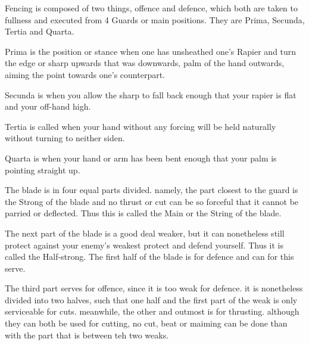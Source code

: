 \newpage


\newpage



Fencing is composed of two things, offence and defence, which both are
taken to fullness and executed from 4 Guards or main
positions. They are Prima, Secunda, Tertia and
Quarta.

Prima is the position or stance when one has unsheathed one's Rapier
and turn the edge or sharp upwards that was downwards, palm of the
hand outwards, aiming the point towards one's counterpart.

Secunda is when you allow the sharp to fall back enough that your
rapier is flat and your off-hand high.

Tertia is called when your hand without any forcing will be held
naturally without turning to neither siden.

Quarta is when your hand or arm has been bent enough that your palm is
pointing straight up.


The blade is in four equal parts divided. namely, the part closest to
the guard is the Strong of the blade and no thrust or cut can be so
forceful that it cannot be parried or deflected. Thus this is called
the Main or the String of the blade.

The next part of the blade is a good deal weaker, but it can
nonetheless still protect against your enemy's weakest protect and
defend yourself. Thus it is called the Half-strong. The first half of
the blade is for defence and can for this serve.

The third part serves for offence, since it is too weak for
defence. it is nonetheless divided into two halves, such that one half
and the first part of the weak is only serviceable for
cuts. meanwhile, the other and outmost is for thrusting. although they
can both be used for cutting, no cut, beat or maiming can be done than
with the part that is between teh two weaks.

